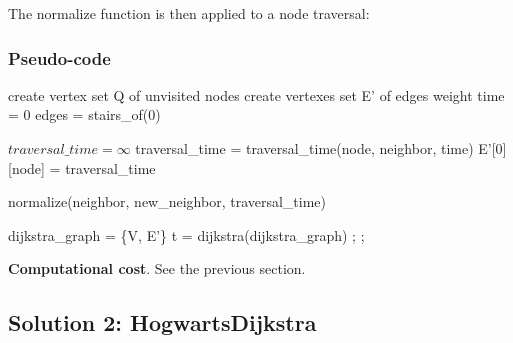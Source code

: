 \documentclass{article}
\begin{document}
The normalize function is then applied to a node traversal:

\subsubsection{Pseudo-code}

\begin{algorithmic}[1]
  \State create vertex set Q of unvisited nodes\;
  \State create vertexes set E' of edges weight\;
  \State time = 0\;                   
  \State edges = stairs\_of(0)\;      

  \State {}
    \Return{}
  \EndIf

  \State $traversal\_time = \infty$
      \State traversal\_time = traversal\_time(node, neighbor, time)
      \State E'[0][node] = traversal\_time   
      \State {}

      \State normalize(neighbor, new\_neighbor, traversal\_time)
      \EndFor
  \EndFor

  \State dijkstra\_graph = \{V, E'\}
  \State t = dijkstra(dijkstra\_graph)
  \State {} ;
        \Else {};
        \EndIf
  \EndFunction
\end{algorithmic}

\begin{framed}
  \noindent
  \textbf{Computational cost}. See the previous section.
\end{framed}


\subsection{Solution 2: HogwartsDijkstra}
\end{document}
